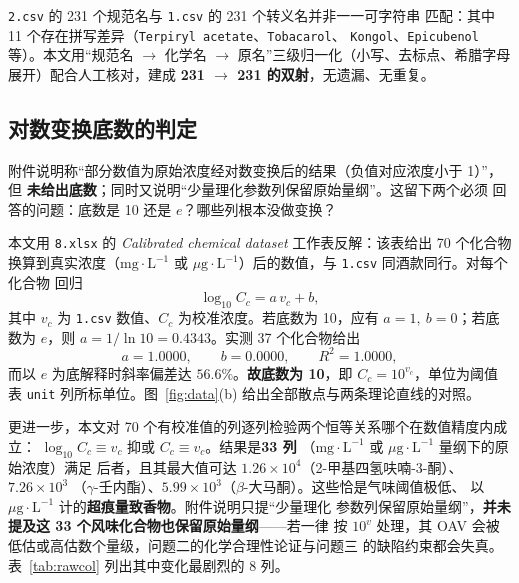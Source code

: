 \texttt{2.csv} 的 231 个规范名与 \texttt{1.csv} 的 231 个转义名并非一一可字符串
匹配：其中 11 个存在拼写差异（\texttt{Terpiryl\ acetate}、\texttt{Tobacarol}、
\texttt{Kongol}、\texttt{Epicubenol} 等）。本文用“规范名 $\rightarrow$ 化学名
$\rightarrow$ 原名”三级归一化（小写、去标点、希腊字母展开）配合人工核对，建成
\textbf{231 $\rightarrow$ 231 的双射}，无遗漏、无重复。

\subsection{对数变换底数的判定}\label{sec:logbase}

附件说明称“部分数值为原始浓度经对数变换后的结果（负值对应浓度小于 1）”，但
\textbf{未给出底数}；同时又说明“少量理化参数列保留原始量纲”。这留下两个必须
回答的问题：底数是 10 还是 $e$？哪些列根本没做变换？

本文用 \texttt{8.xlsx} 的 \emph{Calibrated chemical dataset} 工作表反解：该表给出
70 个化合物换算到真实浓度（$\mathrm{mg\cdot L^{-1}}$ 或
$\mu\mathrm{g\cdot L^{-1}}$）后的数值，与 \texttt{1.csv} 同酒款同行。对每个化合物
回归
\begin{equation}
\log_{10} C_c = a\, v_c + b ,
\label{eq:logbase}
\end{equation}
其中 $v_c$ 为 \texttt{1.csv} 数值、$C_c$ 为校准浓度。若底数为 10，应有
$a=1,\ b=0$；若底数为 $e$，则 $a=1/\ln 10=0.4343$。实测 37 个化合物给出
\begin{equation}
a = 1.0000,\qquad b = 0.0000,\qquad R^2 = 1.0000 ,
\end{equation}
而以 $e$ 为底解释时斜率偏差达 $56.6\%$。\textbf{故底数为 10}，即
$C_c = 10^{v_c}$，单位为阈值表 \texttt{unit} 列所标单位。图~\ref{fig:data}(b)
给出全部散点与两条理论直线的对照。

更进一步，本文对 70 个有校准值的列逐列检验两个恒等关系哪个在数值精度内成立：
$\log_{10}C_c \equiv v_c$ 抑或 $C_c \equiv v_c$。结果是\textbf{33 列}
（$\mathrm{mg\cdot L^{-1}}$ 或 $\mu\mathrm{g\cdot L^{-1}}$ 量纲下的原始浓度）满足
后者，且其最大值可达 $1.26\times10^4$（2-甲基四氢呋喃-3-酮）、$7.26\times10^3$
（$\gamma$-壬内酯）、$5.99\times10^3$（$\beta$-大马酮）。这些恰是气味阈值极低、
以 $\mu\mathrm{g\cdot L^{-1}}$ 计的\textbf{超痕量致香物}。附件说明只提“少量理化
参数列保留原始量纲”，\textbf{并未提及这 33 个风味化合物也保留原始量纲}——若一律
按 $10^{v}$ 处理，其 OAV 会被低估或高估数个量级，问题二的化学合理性论证与问题三
的缺陷约束都会失真。表~\ref{tab:rawcol} 列出其中变化最剧烈的 8 列。

